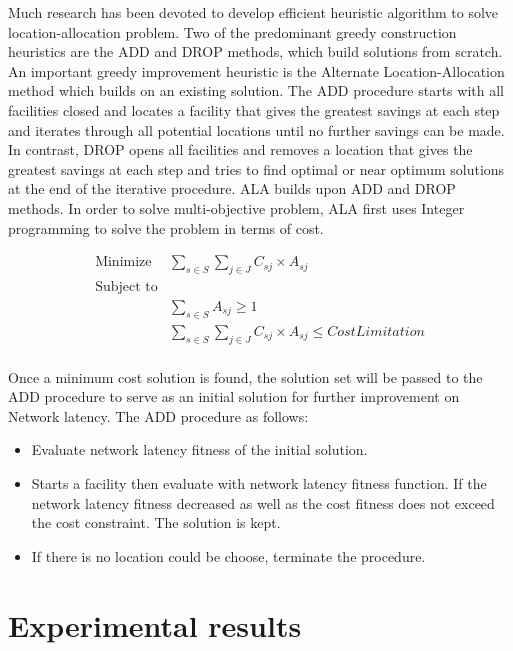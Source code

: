 \documentclass[twoside]{article}
\begin{document}
Much research has been devoted to develop efficient heuristic algorithm to solve location-allocation problem. Two of the predominant
greedy construction heuristics are the ADD and DROP \cite{Sun} methods, which build solutions from scratch. 
An important greedy improvement heuristic is the Alternate Location-Allocation method which builds on an existing solution. 
The ADD procedure starts with all facilities closed and locates a facility that gives the greatest savings at each step and 
iterates through all potential locations until no further savings can be made. In contrast, DROP opens all facilities and removes a 
location that gives the greatest savings at each step and tries to find optimal or near optimum solutions at the end of the 
iterative procedure. ALA builds upon ADD and DROP methods. In order to solve multi-objective problem, ALA first uses Integer programming
to solve the problem in terms of cost.
		

\begin{equation}
     \begin{align}
       \mbox{Minimize } & \sum\limits_{s \in S} \sum\limits_{j \in J} C_{sj} \times A_{sj} \\
       \mbox{Subject to} & \\
	        & \sum\limits_{s \in S} A_{sj} \geq 1 \\
	        & \sum\limits_{s \in S} \sum\limits_{j \in J} C_{sj} \times A_{sj} \leq CostLimitation \\
     \end{align}
\end{equation}

Once a minimum cost solution is found, the solution set will be passed to the ADD procedure to serve as an initial solution for 
further improvement on Network latency. The ADD procedure as follows:
\begin{itemize}
	\item Evaluate network latency fitness of the initial solution.
	\item Starts a facility then evaluate with network latency fitness function. If the network latency fitness decreased as well as 
		the cost fitness does not exceed the cost constraint. The solution is kept.
	\item If there is no location could be choose, terminate the procedure.
\end{itemize}


\section{Experimental results}
\end{document}
